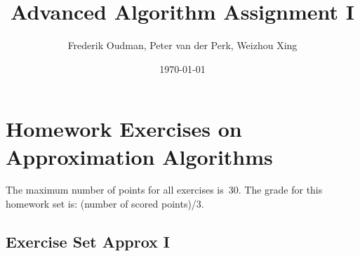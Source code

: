 \documentclass{article}
\title{Advanced Algorithm Assignment I}
\author{Frederik Oudman, Peter van der Perk, Weizhou Xing}
\date{\today}
\begin{document}
	\maketitle
	\section*{Homework Exercises on Approximation Algorithms}
	The maximum number of points for all exercises is~30.
	The grade for this homework set is: (number of scored points)/3.
	
	\newcommand{\setnr}{A.I}
	\subsection*{Exercise Set Approx I}
\end{document}
